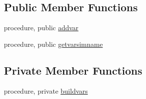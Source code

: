 \subsection*{Public Member Functions}
\begin{DoxyCompactItemize}
\item 
procedure, public \mbox{\hyperlink{structsimulationglobals__mod_1_1var__names__t_ad8f0446f28faf00796d4952116484509}{addvar}}
\item 
procedure, public \mbox{\hyperlink{structsimulationglobals__mod_1_1var__names__t_a6c6e9ecef4ab851c104348393a5ba9ec}{getvarsimname}}
\end{DoxyCompactItemize}
\subsection*{Private Member Functions}
\begin{DoxyCompactItemize}
\item 
procedure, private \mbox{\hyperlink{structsimulationglobals__mod_1_1var__names__t_a9a30996df58e3c94b86e6661291f4305}{buildvars}}
\end{DoxyCompactItemize}

